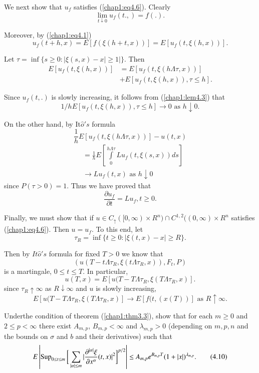 We next show that $u_f$ satisfies (\ref{chap1:eq4.6}). Clearly 
$$
\lim_{ t \downarrow 0} u_f (t.,) = f(.).
$$

Moreover, by (\ref{chap1:eq4.1})
$$
u_f (t+h, x)=E[f(\xi (h+t,x))]= E[u_f (t,\xi (h,x))]. 
$$

Let $\tau = \inf \{s \geq 0 : | \xi (s,x) -x| \geq 1| \}$. Then 
\begin{align*}
E[u_f (t,\xi (h,x))] & = E[u_f (t,\xi (h \Lambda \tau , x))]\\
& + E[u_f (t,\xi (h,x)), \tau \leq h].
\end{align*}\pageoriginale

Since $u_f(t,.)$ is slowly increasing, it follows from
(\ref{chap1:lem4.3}) that  
$$
1/h E[u_f (t,\xi (h,x)), \tau \leq h] \to 0 \text{ as } h \downarrow 0 .
$$

On the other hand, by It$\hat{o}'s$ formula 
$$
\frac{1}{h}E[u_f (t,\xi (h \Lambda \tau , x))]-u (t,x) 
$$
\begin{align*}
& = \frac{1}{h}E[ \int \limits^{h \Lambda \tau}_{0} L u_f (t,\xi
    (s,x))ds] \\ 
& \to L u_f (t,x) \text{ as } h \downarrow 0
\end{align*}
since $P (\tau > 0) =1$. Thus we have proved that 
$$
\frac{\partial u_f}{\partial t}= L u_f, t \geq 0 . 
$$

Finally, we must show that if $u \in C_\uparrow ( [0, \infty)\times
  R^n) \cap C^{1,2}((0 , \infty ) \times R^n$ satisfies (\ref{chap1:eq4.6}). Then
  $u = u_f$. To this end, let 
$$
\tau_R = \inf \{ t \geq 0 : | \xi (t,x)- x| \geq R \}.
$$

Then by $It \hat{o}'s$ formula for fixed $T > 0$ we know that
$$
(u (T - t \Lambda \tau_R , \xi (t \Lambda \tau_R, x)), F_t, P)
$$
is a martingale, $0 \leq t \leq T$. In particular,
$$
u(T,x) =E[u(T-T \Lambda \tau_R,\xi (T \Lambda \tau_R , x)].
$$
since $\tau_R \uparrow \infty $ as $R \downarrow \infty $ and $u$ is
slowly increasing, 
$$
E[u(T-T \Lambda \tau_R, \xi (T \Lambda \tau_R, x)] \to E[f (t,(x(T))]
\text{ as } R \uparrow \infty. 
$$

\setcounter{exercise}{8}
\begin{exercise}\label{chap1:exer4.9} %
Under\pageoriginale the condition of theorem (\ref{chap1:thm3.3}),
show that for each 
$m \geq 0$ and $2 \leq p < \infty$ there exist $A_{m,p}$, $B_{m,p} <
\infty$ and $\lambda_{m,p}> 0$ (depending on $m,p,n$ and the bounds on
$\sigma $ and $b$ and their derivatives) such that  
\begin{equation*}
E \left| \operatorname{Sup}_{0 \leq t \leq m}\bigg [ \sum_{| \alpha | \leq m}| \frac
  {\partial ^{| \alpha |}\xi}{\partial x^\alpha}(t,x)|^2 \bigg
]^{p/2} \right| \leq A_{m,p}e^{B_{m,p}T}(1+
|x|)^{\lambda_{m,p}}.\tag{4.10}\label{chap1:eq4.10}  
\end{equation*}
\end{exercise}

